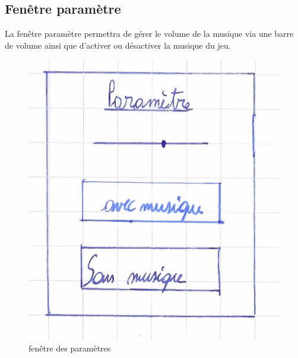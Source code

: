 \subsection{Fenêtre paramètre}
La fenêtre paramètre permettra de gérer le volume de la musique via une barre de volume ainsi que d'activer ou désactiver la musique du jeu.
\begin{figure} [ht]
	\centering
	\includegraphics{setting.jpeg}
	\caption{fenêtre des paramètres}
	\label{fenêtre des paramètres}
\end{figure}
